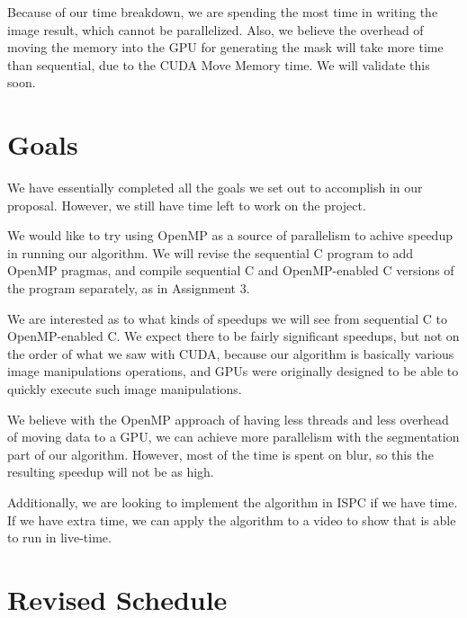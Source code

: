 \documentclass[12pt]{article}
\begin{document}
Because of our time breakdown, we are spending the most time in writing the
image result, which cannot be parallelized. Also, we believe the overhead of
moving the memory into the GPU for generating the mask will take more time than
sequential, due to the CUDA Move Memory time. We will validate this soon.

\section{Goals}

We have essentially completed all the goals we set out to accomplish in our
proposal. However, we still have time left to work on the project.

We would like to try using OpenMP as a source of parallelism to achive speedup
in running our algorithm. We will revise the sequential C program to add OpenMP
pragmas, and compile sequential C and OpenMP-enabled C versions of the program
separately, as in Assignment 3.

We are interested as to what kinds of speedups we will see from sequential C to
OpenMP-enabled C. We expect there to be fairly significant speedups, but not on
the order of what we saw with CUDA, because our algorithm is basically various
image manipulations operations, and GPUs were originally designed to be able to
quickly execute such image manipulations.

We believe with the OpenMP approach of having less threads and less overhead of
moving data to a GPU, we can achieve more parallelism with the segmentation
part of our algorithm. However, most of the time is spent on blur, so this the
resulting speedup will not be as high.

Additionally, we are looking to implement the algorithm in ISPC if we have time.
If we have extra time, we can apply the algorithm to a video to show that is
able to run in live-time.

\section{Revised Schedule}
\end{document}
